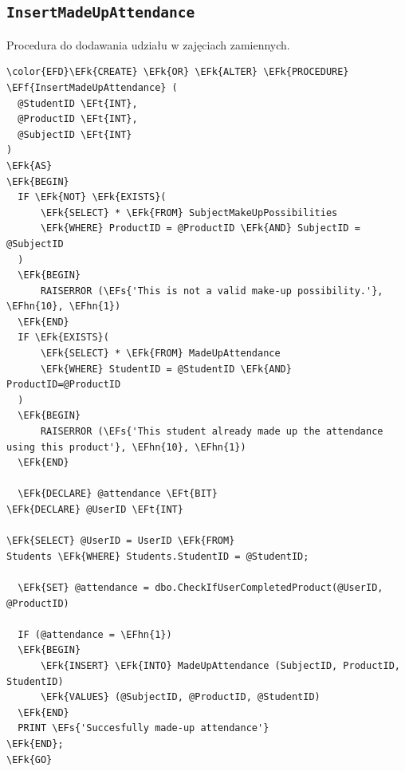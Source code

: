 \documentclass[11pt]{article}
\newcommand{\EFs}[1]{\textcolor{EFs}{#1}} %
\newcommand{\EFk}[1]{\textcolor{EFk}{\textbf{#1}}} %
\newcommand{\EFf}[1]{\textcolor{EFf}{#1}} %
\newcommand{\EFt}[1]{\textcolor{EFt}{\textbf{#1}}} %
\newcommand{\EFhn}[1]{\textcolor{EFhn}{#1}} %
\begin{document}
\subsection{\texttt{InsertMadeUpAttendance}}
\label{sec:orgb1bc563}
Procedura do dodawania udziału w zajęciach zamiennych.
\begin{Code}
\begin{Verbatim}
\color{EFD}\EFk{CREATE} \EFk{OR} \EFk{ALTER} \EFk{PROCEDURE} \EFf{InsertMadeUpAttendance} (
  @StudentID \EFt{INT},
  @ProductID \EFt{INT},
  @SubjectID \EFt{INT}
)
\EFk{AS}
\EFk{BEGIN}
  IF \EFk{NOT} \EFk{EXISTS}(
      \EFk{SELECT} * \EFk{FROM} SubjectMakeUpPossibilities
      \EFk{WHERE} ProductID = @ProductID \EFk{AND} SubjectID = @SubjectID
  )
  \EFk{BEGIN}
      RAISERROR (\EFs{'This is not a valid make-up possibility.'}, \EFhn{10}, \EFhn{1})
  \EFk{END}
  IF \EFk{EXISTS}(
      \EFk{SELECT} * \EFk{FROM} MadeUpAttendance
      \EFk{WHERE} StudentID = @StudentID \EFk{AND} ProductID=@ProductID
  )
  \EFk{BEGIN}
      RAISERROR (\EFs{'This student already made up the attendance using this product'}, \EFhn{10}, \EFhn{1})
  \EFk{END}

  \EFk{DECLARE} @attendance \EFt{BIT}
\EFk{DECLARE} @UserID \EFt{INT}

\EFk{SELECT} @UserID = UserID \EFk{FROM}
Students \EFk{WHERE} Students.StudentID = @StudentID;

  \EFk{SET} @attendance = dbo.CheckIfUserCompletedProduct(@UserID, @ProductID)

  IF (@attendance = \EFhn{1})
  \EFk{BEGIN}
      \EFk{INSERT} \EFk{INTO} MadeUpAttendance (SubjectID, ProductID, StudentID)
      \EFk{VALUES} (@SubjectID, @ProductID, @StudentID)
  \EFk{END}
  PRINT \EFs{'Succesfully made-up attendance'}
\EFk{END};
\EFk{GO}
\end{Verbatim}
\end{Code}
\end{document}
